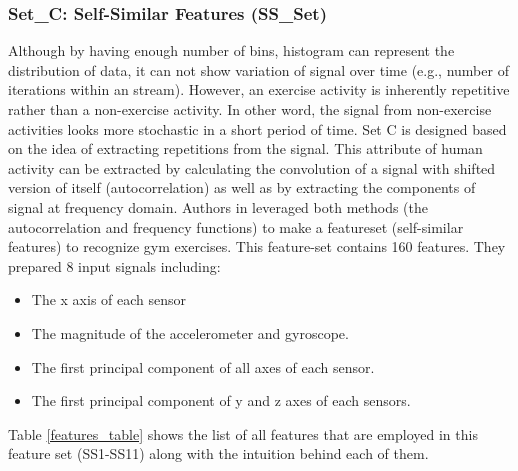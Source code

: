 \documentclass[journal,article,submit,moreauthors,pdftex]{Definitions/mdpi}
\newcommand{\hosein}[1]{\textcolor{orange}{{\it [Hosein: #1]}}}
\begin{document}
\subsubsection{Set\_C: Self-Similar Features (SS\_Set)}
Although by having enough number of bins, histogram can represent the distribution of data, it can not show variation of signal over time (e.g., number of iterations within an stream). However, an exercise activity is inherently repetitive rather than a non-exercise activity. In other word, the signal from non-exercise activities looks more stochastic in a short period of time. Set C is designed based on the idea of extracting repetitions from the signal. This attribute of human activity can be extracted by calculating the convolution of a signal with shifted version of itself (autocorrelation) as well as by extracting the components of signal at frequency domain. Authors in \cite{morris2014recofit} leveraged both methods (the autocorrelation and frequency functions) to make a featureset (self-similar features) to recognize gym exercises. This feature-set contains 160 features. They prepared 8 input signals including: 
\begin{itemize}
	\item The x axis of each sensor\\
	\item The magnitude of the accelerometer and gyroscope. \\
	\item The first principal component of all axes of each sensor.\\
	\item The first principal component of y and z axes of each sensors.\\
\end{itemize}
Table \ref{features_table} shows the list of all features that are employed in this feature set (SS1-SS11) along with the intuition behind each of them.
\end{document}
